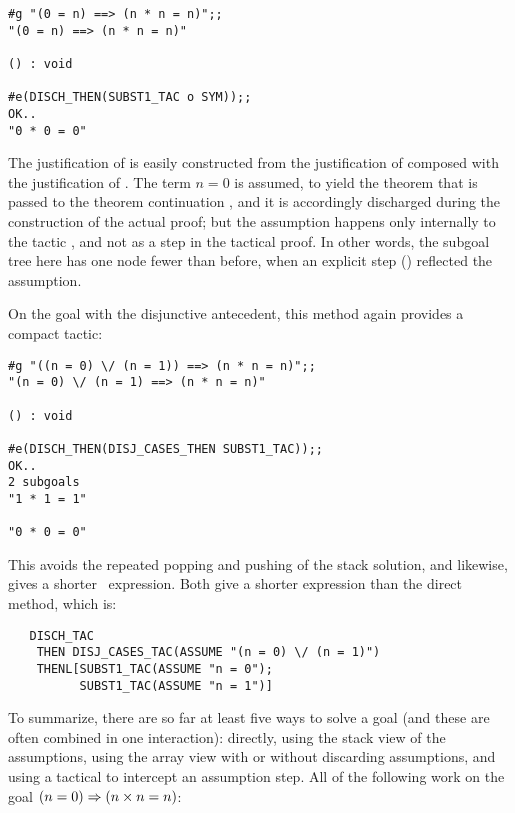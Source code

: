 \setcounter{sessioncount}{1}
\begin{session}\begin{verbatim}
#g "(0 = n) ==> (n * n = n)";;
"(0 = n) ==> (n * n = n)"

() : void

#e(DISCH_THEN(SUBST1_TAC o SYM));;
OK..
"0 * 0 = 0"
\end{verbatim}\end{session}

The justification of  is easily constructed
from the justification of  composed with the justification of
. 
The term $n=0$ is assumed, to yield the
theorem that is passed to the theorem continuation ,
and it is accordingly discharged during the construction of the
actual proof; but the assumption happens
only internally
 to the tactic , and not
as a step in the tactical proof.  In other words, the subgoal tree here
has one node fewer than before, when an explicit step ()
reflected the assumption.

On the goal with the disjunctive antecedent, this method again
provides a compact tactic:

\setcounter{sessioncount}{1}
\begin{session}\begin{verbatim}
#g "((n = 0) \/ (n = 1)) ==> (n * n = n)";;
"(n = 0) \/ (n = 1) ==> (n * n = n)"

() : void

#e(DISCH_THEN(DISJ_CASES_THEN SUBST1_TAC));;
OK..
2 subgoals
"1 * 1 = 1"

"0 * 0 = 0"
\end{verbatim}\end{session}

\noindent This avoids the repeated popping and pushing of the stack
solution, and likewise, gives a shorter \ML\ expression. Both give
a shorter expression than the direct method, which is:

\begin{hol}\begin{verbatim}
   DISCH_TAC
    THEN DISJ_CASES_TAC(ASSUME "(n = 0) \/ (n = 1)")
    THENL[SUBST1_TAC(ASSUME "n = 0");
          SUBST1_TAC(ASSUME "n = 1")]
\end{verbatim}\end{hol}

To summarize, there are so far at least five ways to solve a goal
(and these are often combined in one interaction):
directly, using the stack view of the assumptions,
using the array view with or without discarding assumptions, and using a
tactical to intercept an assumption step.  All of the following work
on the goal $(n=0) \Rightarrow (n \times n = n)$:

